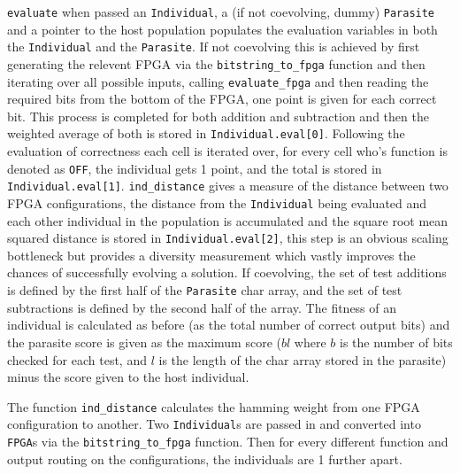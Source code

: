 \texttt{evaluate} when passed an \texttt{Individual}, a (if not coevolving, dummy) \texttt{Parasite}
and a pointer to the host population populates the evaluation variables in both
the \texttt{Individual} and the \texttt{Parasite}. If not coevolving this is achieved
by first generating the relevent FPGA via the \texttt{bitstring\_to\_fpga} function
and then iterating over all possible inputs, calling \texttt{evaluate\_fpga} and
then reading the required bits from the bottom of the FPGA, one point is given
for each correct bit. This process is completed for both addition and subtraction
and then the weighted average of both is stored in \texttt{Individual.eval[0]}.
Following the evaluation of correctness each cell is iterated over, for every
cell who's function is denoted as \texttt{OFF}, the individual gets 1 point,
and the total is stored in \texttt{Individual.eval[1]}. \texttt{ind\_distance}
gives a measure of the distance between two FPGA configurations, the distance
from the \texttt{Individual} being evaluated and each other individual in the
population is accumulated and the square root mean squared distance is stored
in \texttt{Individual.eval[2]}, this step is an obvious scaling bottleneck but
provides a diversity measurement which vastly improves the chances of successfully
evolving a solution. If coevolving, the set of test additions is defined by the
first half of the \texttt{Parasite} char array, and the set of test subtractions
is defined by the second half of the array. The fitness of an individual is calculated
as before (as the total number of correct output bits) and the parasite score is
given as the maximum score ($bl$ where $b$ is the number of bits checked for each
test, and $l$ is the length of the char array stored in the parasite) minus
the score given to the host individual.

The function \texttt{ind\_distance}
calculates the hamming weight from one FPGA configuration to another. Two
\texttt{Individual}s are passed in and converted into \texttt{FPGA}s via the \texttt{bitstring\_to\_fpga}
function. Then for every
different function and output routing on the configurations, the individuals are 1 further apart.

